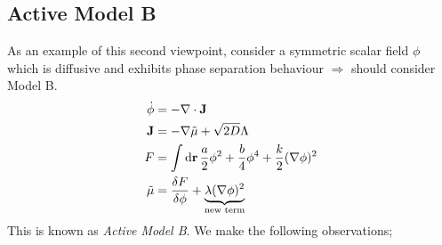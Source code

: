 \subsection{Active Model B} 
As an example of this second viewpoint, consider a symmetric scalar field $\phi$ which is diffusive and exhibits phase separation behaviour $\Rightarrow$ should consider Model B.
\begin{align*}
\dot{\phi} &= -\nabla \cdot \mathbf{J} \\
\mathbf{J} &= -\nabla \tilde{\mu} + \sqrt{2D}\Lambda \\
F &= \int{\text{d}\mathbf{r} \,\frac{a}{2}\phi^2 + \frac{b}{4}\phi^4 + \frac{k}{2}(\nabla \phi)^2} \\
\tilde{\mu} &= \frac{\delta F}{\delta \phi} + \underbrace{\lambda (\nabla \phi)^2}_{\text{new term}}
\end{align*}
This is known as \emph{Active Model B}. We make the following observations;
